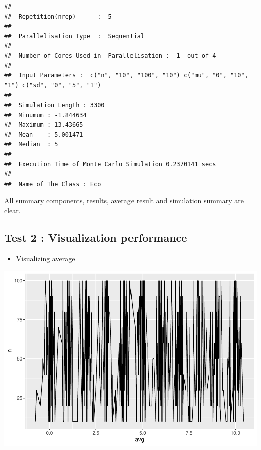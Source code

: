 \documentclass[11pt,a4paper]{article}
\newenvironment{Shaded}{\begin{snugshade}}{\end{snugshade}}
\newcommand{\AttributeTok}[1]{\textcolor[rgb]{0.77,0.63,0.00}{#1}}
\newcommand{\FunctionTok}[1]{\textcolor[rgb]{0.00,0.00,0.00}{#1}}
\newcommand{\NormalTok}[1]{#1}
\newcommand{\SpecialCharTok}[1]{\textcolor[rgb]{0.00,0.00,0.00}{#1}}
\begin{document}
\begin{verbatim}
## 
##  Repetition(nrep)      :  5 
## 
##  Parallelisation Type  :  Sequential 
## 
##  Number of Cores Used in  Parallelisation :  1  out of 4 
## 
##  Input Parameters :  c("n", "10", "100", "10") c("mu", "0", "10", "1") c("sd", "0", "5", "1") 
## 
##  Simulation Length : 3300 
##  Minumum : -1.844634 
##  Maximum : 13.43665 
##  Mean    : 5.001471 
##  Median  : 5 
## 
##  Execution Time of Monte Carlo Simulation 0.2370141 secs 
## 
##  Name of The Class : Eco
\end{verbatim}

All summary components, results, average result and simulation summary
are clear.

\hypertarget{test-2-visualization-performance}{%
\subsection{Test 2 : Visualization
performance}\label{test-2-visualization-performance}}

\begin{itemize}
\tightlist
\item
  Visualizing average
\end{itemize}

\begin{Shaded}
\end{Shaded}

\includegraphics{Abschlussarbeit_01_Sep_files/figure-latex/ggplot2-1.pdf}
\end{document}
